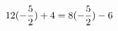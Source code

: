 \documentclass[preview]{standalone}
\begin{document}
\begin{align*}
\special{dvisvgm:raw <g id='unique000'>}12 (- \frac{5}{2}) + 4 = 8 (- \frac{5}{2}) - 6\special{dvisvgm:raw </g>}
\end{align*}
\end{document}
